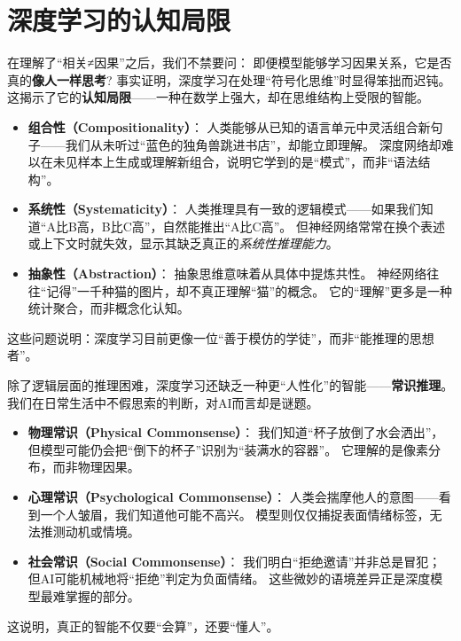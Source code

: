 \section{深度学习的认知局限}

在理解了“相关≠因果”之后，我们不禁要问：  
即便模型能够学习因果关系，它是否真的\textbf{像人一样思考}?  
事实证明，深度学习在处理“符号化思维”时显得笨拙而迟钝。  
这揭示了它的\textbf{认知局限}——一种在数学上强大，却在思维结构上受限的智能。

\begin{itemize}
\item \textbf{组合性（Compositionality）}：  
  人类能够从已知的语言单元中灵活组合新句子——我们从未听过“蓝色的独角兽跳进书店”，却能立即理解。  
  深度网络却难以在未见样本上生成或理解新组合，说明它学到的是“模式”，而非“语法结构”。  

\item \textbf{系统性（Systematicity）}：  
  人类推理具有一致的逻辑模式——如果我们知道“A比B高，B比C高”，自然能推出“A比C高”。  
  但神经网络常常在换个表述或上下文时就失效，显示其缺乏真正的\textit{系统性推理能力}。  

\item \textbf{抽象性（Abstraction）}：  
  抽象思维意味着从具体中提炼共性。  
  神经网络往往“记得”一千种猫的图片，却不真正理解“猫”的概念。  
  它的“理解”更多是一种统计聚合，而非概念化认知。  
\end{itemize}
这些问题说明：深度学习目前更像一位“善于模仿的学徒”，而非“能推理的思想者”。

除了逻辑层面的推理困难，深度学习还缺乏一种更“人性化”的智能——\textbf{常识推理}。  
我们在日常生活中不假思索的判断，对AI而言却是谜题。  

\begin{itemize}
\item \textbf{物理常识（Physical Commonsense）}：  
  我们知道“杯子放倒了水会洒出”，但模型可能仍会把“倒下的杯子”识别为“装满水的容器”。  
  它理解的是像素分布，而非物理因果。  

\item \textbf{心理常识（Psychological Commonsense）}：  
  人类会揣摩他人的意图——看到一个人皱眉，我们知道他可能不高兴。  
  模型则仅仅捕捉表面情绪标签，无法推测动机或情境。  

\item \textbf{社会常识（Social Commonsense）}：  
  我们明白“拒绝邀请”并非总是冒犯；  
  但AI可能机械地将“拒绝”判定为负面情绪。  
  这些微妙的语境差异正是深度模型最难掌握的部分。  
\end{itemize}
这说明，真正的智能不仅要“会算”，还要“懂人”。

